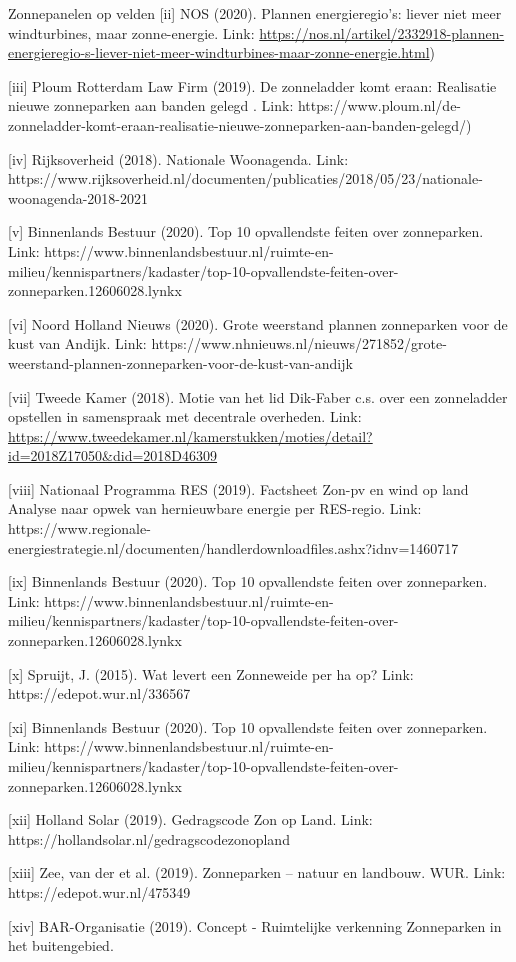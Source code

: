 \begin{voorstel}{Zonnepanelen op velden}
[ii] NOS (2020). Plannen energieregio's: liever niet meer windturbines, maar zonne-energie. Link: \url{https://nos.nl/artikel/2332918-plannen-energieregio-s-liever-niet-meer-windturbines-maar-zonne-energie.html})
 
[iii] Ploum Rotterdam Law Firm (2019). De zonneladder komt eraan: Realisatie nieuwe zonneparken aan banden gelegd . Link: https://www.ploum.nl/de-zonneladder-komt-eraan-realisatie-nieuwe-zonneparken-aan-banden-gelegd/)

[iv] Rijksoverheid (2018). Nationale Woonagenda. Link: https://www.rijksoverheid.nl/documenten/publicaties/2018/05/23/nationale-woonagenda-2018-2021

[v] Binnenlands Bestuur (2020). Top 10 opvallendste feiten over zonneparken. Link: https://www.binnenlandsbestuur.nl/ruimte-en-milieu/kennispartners/kadaster/top-10-opvallendste-feiten-over-zonneparken.12606028.lynkx

[vi] Noord Holland Nieuws (2020). Grote weerstand plannen zonneparken voor de kust van Andijk. Link: https://www.nhnieuws.nl/nieuws/271852/grote-weerstand-plannen-zonneparken-voor-de-kust-van-andijk

[vii] Tweede Kamer (2018). Motie van het lid Dik-Faber c.s. over een zonneladder opstellen in samenspraak met decentrale overheden. Link: \url{https://www.tweedekamer.nl/kamerstukken/moties/detail?id=2018Z17050&did=2018D46309}

[viii] Nationaal Programma RES (2019). Factsheet Zon-pv en wind op land Analyse naar opwek van hernieuwbare energie per RES-regio. Link: https://www.regionale-energiestrategie.nl/documenten/handlerdownloadfiles.ashx?idnv=1460717
 
[ix] Binnenlands Bestuur (2020). Top 10 opvallendste feiten over zonneparken. Link: https://www.binnenlandsbestuur.nl/ruimte-en-milieu/kennispartners/kadaster/top-10-opvallendste-feiten-over-zonneparken.12606028.lynkx

[x]  Spruijt, J. (2015). Wat levert een Zonneweide per ha op? Link: https://edepot.wur.nl/336567

[xi] Binnenlands Bestuur (2020). Top 10 opvallendste feiten over zonneparken. Link: https://www.binnenlandsbestuur.nl/ruimte-en-milieu/kennispartners/kadaster/top-10-opvallendste-feiten-over-zonneparken.12606028.lynkx

[xii] Holland Solar (2019). Gedragscode Zon op Land. Link: https://hollandsolar.nl/gedragscodezonopland

[xiii] Zee, van der et al. (2019). Zonneparken – natuur en landbouw. WUR. Link: https://edepot.wur.nl/475349

[xiv] BAR-Organisatie (2019). Concept - Ruimtelijke verkenning Zonneparken in het buitengebied.

\end{voorstel}
